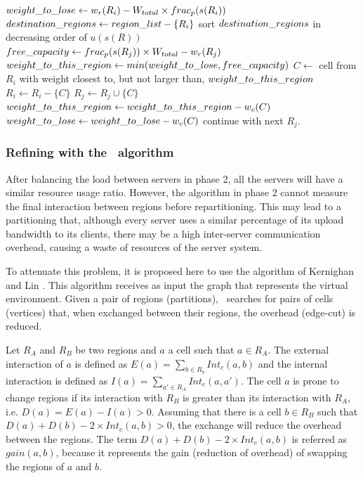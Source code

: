 \begin{algorithm}
\caption{\bfa}
\label{alg:bfa}
\begin{algorithmic}[1]

			\STATE $weight\_to\_lose \leftarrow w_r(R_i) - W_{total} \times frac_p(s(R_i))$ \label{alg:bfa:wlose}
			\STATE $destination\_regions \leftarrow region\_list - \{R_i\}$
			\STATE sort $destination\_regions$ in decreasing order of $u(s(R))$ \label{alg:bfa:sort}
				 \STATE $free\_capacity \leftarrow frac_p(s(R_j)) \times W_{total} - w_r(R_j)$ \label{alg:bfa:freecap}
				 \STATE $weight\_to\_this\_region \leftarrow min(weight\_to\_lose, free\_capacity)$ \label{alg:bfa:min}
				 			 \STATE $C \leftarrow$ cell from $R_i$ with weight closest to, but not larger than, $weight\_to\_this\_region$ \label{alg:bfa:bestfit}
				 			 \STATE $R_i \leftarrow R_i - \{C\}$
				 			 \STATE $R_j \leftarrow R_j \cup \{C\}$
				 			 \STATE $weight\_to\_this\_region \leftarrow weight\_to\_this\_region - w_c(C)$
				 			 \STATE $weight\_to\_lose \leftarrow weight\_to\_lose - w_c(C)$
				 		\ELSE
				 			 \STATE continue with next $R_j$. \label{alg:bfa:continue}
				 		\ENDIF
				 \ENDWHILE
			\ENDFOR			
	 \ENDFOR

\end{algorithmic}
\end{algorithm}


\subsubsection{Refining with the \kl\ algorithm}
\label{sec:alg:kl}
	
After balancing the load between servers in phase 2, all the servers will have a similar resource usage ratio. However, the algorithm in phase 2 cannot measure the final interaction between regions before repartitioning. This may lead to a partitioning that, although every server uses a similar percentage of its upload bandwidth to its clients, there may be a high inter-server communication overhead, causing a waste of resources of the server system.

To attenuate this problem, it is proposed here to use the algorithm of Kernighan and Lin \cite{kernighan1970ehp}. This algorithm receives as input the graph that represents the virtual environment. Given a pair of regions (partitions), \kl\ searches for pairs of cells (vertices) that, when exchanged between their regions, the overhead (edge-cut) is reduced.

Let $R_A$ and $R_B$ be two regions and $a$ a cell such that $a \in R_A$. The external interaction of $a$ is defined as $E(a) = \sum_{b \in R_b} Int_c (a, b)$ and the internal interaction is defined as $I(a) = \sum_{a' \in R_A} Int_c(a, a')$. The cell $a$ is prone to change regions if its interaction with $R_B$ is greater than its interaction with $R_A$, i.e. $D(a) = E(a) - I(a) > 0$. Assuming that there is a cell $b \in R_B$ such that $D(a) + D(b) - 2 \times Int_c(a, b) > 0 $, the exchange will reduce the overhead between the regions. The term $D(a) + D(b) - 2 \times Int_c(a, b)$ is referred as $gain(a, b)$, because it represents the gain (reduction of overhead) of swapping the regions of $a$ and $b$.

